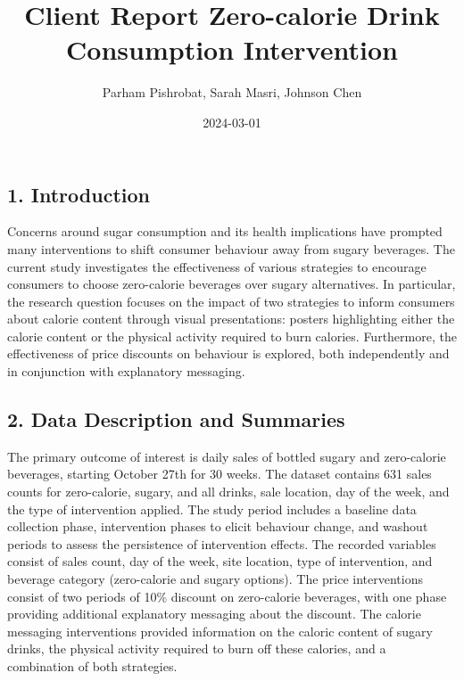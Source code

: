 \documentclass[
]{article}
\title{Client Report Zero-calorie Drink Consumption Intervention}
\author{Parham Pishrobat, Sarah Masri, Johnson Chen}
\date{2024-03-01}
\begin{document}
\maketitle

\pagebreak

\hypertarget{introduction}{%
\subsection{1. Introduction}\label{introduction}}

Concerns around sugar consumption and its health implications have
prompted many interventions to shift consumer behaviour away from sugary
beverages. The current study investigates the effectiveness of various
strategies to encourage consumers to choose zero-calorie beverages over
sugary alternatives. In particular, the research question focuses on the
impact of two strategies to inform consumers about calorie content
through visual presentations: posters highlighting either the calorie
content or the physical activity required to burn calories. Furthermore,
the effectiveness of price discounts on behaviour is explored, both
independently and in conjunction with explanatory messaging.

\hypertarget{data-description-and-summaries}{%
\subsection{2. Data Description and
Summaries}\label{data-description-and-summaries}}

The primary outcome of interest is daily sales of bottled sugary and
zero-calorie beverages, starting October 27th for 30 weeks. The dataset
contains 631 sales counts for zero-calorie, sugary, and all drinks, sale
location, day of the week, and the type of intervention applied. The
study period includes a baseline data collection phase, intervention
phases to elicit behaviour change, and washout periods to assess the
persistence of intervention effects. The recorded variables consist of
sales count, day of the week, site location, type of intervention, and
beverage category (zero-calorie and sugary options). The price
interventions consist of two periods of 10\% discount on zero-calorie
beverages, with one phase providing additional explanatory messaging
about the discount. The calorie messaging interventions provided
information on the caloric content of sugary drinks, the physical
activity required to burn off these calories, and a combination of both
strategies.
\end{document}
